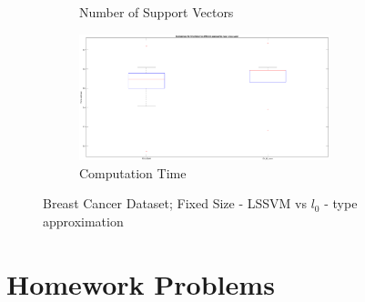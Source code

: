 \begin{figure}[!htpb]
\begin{subfigure}[b]{0.34\textwidth}
		\caption{Number of Support Vectors}\label{fig:Ex3_3.3_2}
	\end{subfigure}%
	\begin{subfigure}[b]{0.34\textwidth}
		\centering
		\includegraphics[height= 0.65\textwidth, width = 0.8\textwidth]{Exercise3/Report/Ex3_3.3_3.eps}
		\caption{Computation Time}\label{fig:Ex3_3.3_3}
	\end{subfigure}%
	\caption{Breast Cancer Dataset; Fixed Size - LSSVM vs $l_0$ - type approximation}
	\label{fig:Ex3_3.3}
\end{figure}
\section{Homework Problems}
